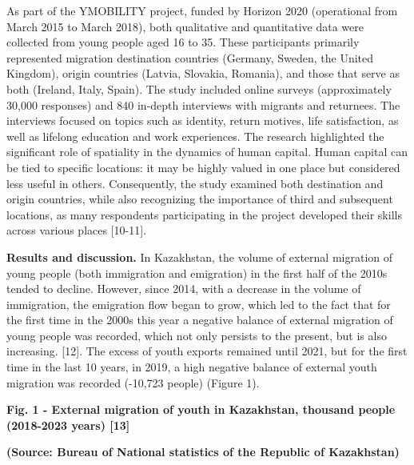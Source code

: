 \begin{multicols}{2}
As part of the YMOBILITY project, funded by Horizon 2020 (operational
from March 2015 to March 2018), both qualitative and quantitative data
were collected from young people aged 16 to 35. These participants
primarily represented migration destination countries (Germany, Sweden,
the United Kingdom), origin countries (Latvia, Slovakia, Romania), and
those that serve as both (Ireland, Italy, Spain). The study included
online surveys (approximately 30,000 responses) and 840 in-depth
interviews with migrants and returnees. The interviews focused on topics
such as identity, return motives, life satisfaction, as well as lifelong
education and work experiences. The research highlighted the significant
role of spatiality in the dynamics of human capital. Human capital can
be tied to specific locations: it may be highly valued in one place but
considered less useful in others. Consequently, the study examined both
destination and origin countries, while also recognizing the importance
of third and subsequent locations, as many respondents participating in
the project developed their skills across various places {[}10-11{]}.

{\bfseries Results and discussion.} In Kazakhstan, the volume of external
migration of young people (both immigration and emigration) in the first
half of the 2010s tended to decline. However, since 2014, with a
decrease in the volume of immigration, the emigration flow began to
grow, which led to the fact that for the first time in the 2000s this
year a negative balance of external migration of young people was
recorded, which not only persists to the present, but is also
increasing. {[}12{]}. The excess of youth exports remained until 2021,
but for the first time in the last 10 years, in 2019, a high negative
balance of external youth migration was recorded (-10,723 people)
(Figure 1).
\end{multicols}

{\bfseries Fig. 1 - External migration of youth in Kazakhstan, thousand people (2018-2023 years) {[}13{]}}

{\bfseries (Source: Bureau of National statistics of the Republic of Kazakhstan)}

